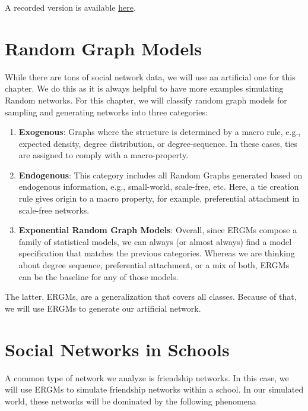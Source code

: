 \documentclass[
]{book}
\begin{document}
A recorded version is available \href{https://youtu.be/VasQf--gT-E}{here}.

\hypertarget{random-graph-models}{%
\section{Random Graph Models}\label{random-graph-models}}

While there are tons of social network data, we will use an artificial one for this chapter.
We do this as it is always helpful to have more examples simulating Random
networks. For this chapter, we will classify random graph models for sampling and
generating networks into three categories:

\begin{enumerate}
\def\labelenumi{\arabic{enumi}.}
\item
  \textbf{Exogenous}: Graphs where the structure is determined by a macro rule, e.g.,
  expected density, degree distribution, or degree-sequence. In these cases,
  ties are assigned to comply with a macro-property.
\item
  \textbf{Endogenous}: This category includes all Random Graphs generated based
  on endogenous information, e.g., small-world, scale-free, etc. Here, a tie
  creation rule gives origin to a macro property, for example, preferential attachment
  in scale-free networks.
\item
  \textbf{Exponential Random Graph Models}: Overall, since ERGMs compose a family
  of statistical models, we can always (or almost always) find a model specification
  that matches the previous categories. Whereas we are thinking about degree sequence,
  preferential attachment, or a mix of both, ERGMs can be the baseline for any of
  those models.
\end{enumerate}

The latter, ERGMs, are a generalization that covers all classes. Because of that,
we will use ERGMs to generate our artificial network.

\hypertarget{social-networks-in-schools}{%
\section{Social Networks in Schools}\label{social-networks-in-schools}}

A common type of network we analyze is friendship networks. In this case,
we will use ERGMs to simulate friendship networks within a school. In our
simulated world, these networks will be dominated by the following phenomena
\end{document}
